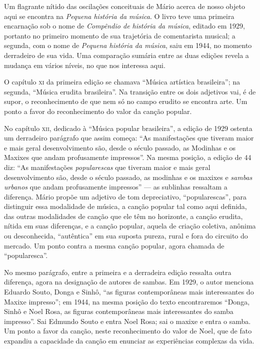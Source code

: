 Um flagrante nítido das oscilações conceituais de Mário acerca de nosso
objeto aqui se encontra na \emph{Pequena história da música}. O livro
teve uma primeira encarnação sob o nome de \emph{Compêndio de história
da música}, editado em 1929, portanto no primeiro momento de sua
trajetória de comentarista musical; a segunda, com o nome de
\emph{Pequena história da música}, saiu em 1944, no momento derradeiro
de sua vida. Uma comparação sumária entre as duas edições revela a
mudança em vários níveis, no que nos interessa aqui.

O capítulo \textsc{xi} da primeira edição se chamava ``Música artística
brasileira''; na segunda, ``Música erudita brasileira''. Na transição
entre os dois adjetivos vai, é de supor, o reconhecimento de que nem só
no campo erudito se encontra arte. Um ponto a favor do reconhecimento do
valor da canção popular.

No capítulo \textsc{xii}, dedicado à ``Música popular brasileira'', a edição de
1929 ostenta um derradeiro parágrafo que assim começa: ``As
manifestações que
tiveram maior e mais geral desenvolvimento são, desde o século passado,
as Modinhas e os Maxixes que andam profusamente impressos''. Na mesma
posição, a edição de 44 diz: ``As manifestações \emph{popularescas} que
tiveram maior e mais geral desenvolvimento são, desde o século passado,
as modinhas e os maxixes e \emph{sambas urbanos} que andam profusamente
impressos'' --- as sublinhas ressaltam a diferença. Mário propõe um
adjetivo de tom depreciativo, ``popularescas'', para distinguir essa
modalidade de música, a canção popular tal como aqui definida, das
outras modalidades de canção que ele têm no horizonte, a canção erudita,
nítida em suas diferenças, e a canção popular, aquela de criação
coletiva, anônima ou desconhecida, ``autêntica'' em sua suposta pureza,
rural e fora do circuito do mercado. Um ponto contra a mesma canção
popular, agora chamada de ``popularesca''.

No mesmo parágrafo, entre a primeira e a derradeira edição ressalta
outra diferença, agora na designação de autores de sambas. Em 1929, o
autor menciona Eduardo Souto, Donga e Sinhô, ``as figuras contemporâneas
mais interessantes do Maxixe impresso''; em 1944, na mesma posição do
texto encontraremos ``Donga, Sinhô e Noel Rosa, as figuras
contemporâneas mais interessantes do samba impresso''. Sai Edmundo Souto
e entra Noel Rosa; sai o maxixe e entra o samba. Um ponto a favor da
canção, neste reconhecimento do valor de Noel, que de fato expandiu a
capacidade da canção em enunciar as experiências complexas da vida.

